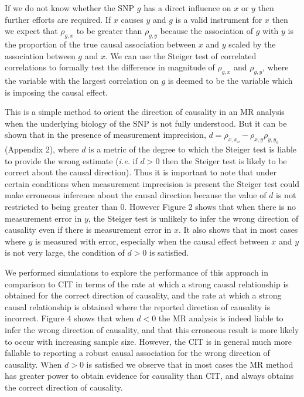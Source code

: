 \documentclass[]{article}
\begin{document}
If we do not know whether the SNP \(g\) has a direct influence on \(x\)
or \(y\) then further efforts are required. If \(x\) causes \(y\) and
\(g\) is a valid instrument for \(x\) then we expect that \(\rho_{g,x}\)
to be greater than \(\rho_{g,y}\) because the association of \(g\) with
\(y\) is the proportion of the true causal association between \(x\) and
\(y\) scaled by the association between \(g\) and \(x\). We can use the
Steiger test of correlated correlations to formally test the difference
in magnitude of \(\rho_{g,x}\) and \(\rho_{g,y}\), where the variable
with the largest correlation on \(g\) is deemed to be the variable which
is imposing the causal effect.

This is a simple method to orient the direction of causality in an MR
analysis when the underlying biology of the SNP is not fully understood.
But it can be shown that in the presence of measurement imprecision,
\(d = \rho_{x, x_o} - \rho_{x,y}\rho_{y,y_o}\) (Appendix 2), where \(d\)
is a metric of the degree to which the Steiger test is liable to provide
the wrong estimate (\emph{i.e.} if \(d>0\) then the Steiger test is
likely to be correct about the causal direction). Thus it is important
to note that under certain conditions when measurement imprecision is
present the Steiger test could make erroneous inference about the causal
direction because the value of \(d\) is not restricted to being greater
than 0. However Figure 2 shows that when there is no measurement error
in \(y\), the Steiger test is unlikely to infer the wrong direction of
causality even if there is measurement error in \(x\). It also shows
that in most cases where \(y\) is measured with error, especially when
the causal effect between \(x\) and \(y\) is not very large, the
condition of \(d > 0\) is satisfied.

We performed simulations to explore the performance of this approach in
comparison to CIT in terms of the rate at which a strong causal
relationship is obtained for the correct direction of causality, and the
rate at which a strong causal relationship is obtained where the
reported direction of causality is incorrect. Figure 4 shows that when
\(d < 0\) the MR analysis is indeed liable to infer the wrong direction
of causality, and that this erroneous result is more likely to occur
with increasing sample size. However, the CIT is in general much more
fallable to reporting a robust causal association for the wrong
direction of causality. When \(d > 0\) is satisfied we observe that in
most cases the MR method has greater power to obtain evidence for
causality than CIT, and always obtains the correct direction of
causality.
\end{document}
